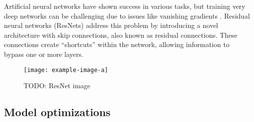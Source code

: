 Artificial neural networks have shown success in various tasks, but training very deep networks can be challenging due to issues like vanishing gradients \cite{}.
Residual neural networks (ResNets) address this problem by introducing a novel architecture with skip connections, also known as residual connections.
These connections create ``shortcuts'' within the network, allowing information to bypass one or more layers.


\begin{figure}[hbtp]
\centering    
\texttt{[image: example-image-a]}
\caption{TODO: ResNet image}
\end{figure}

\subsection{Model optimizations}
